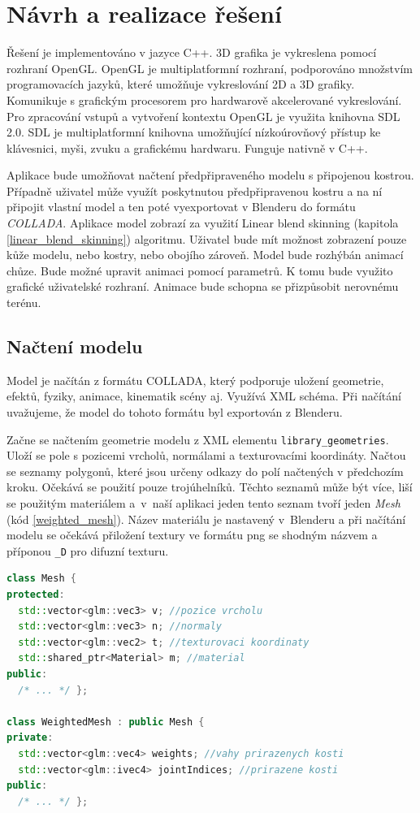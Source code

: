\chapter{Návrh a realizace řešení}
Řešení je implementováno v jazyce C++. 3D grafika je vykreslena pomocí rozhraní OpenGL. OpenGL je multiplatformní rozhraní, podporováno množstvím programovacích jazyků, které umožňuje vykreslování 2D a 3D grafiky. Komunikuje s grafickým procesorem pro hardwarově akcelerované vykreslování. Pro zpracování vstupů a vytvoření kontextu OpenGL je využita knihovna SDL 2.0. SDL je multiplatformní knihovna umožňující nízkoúrovňový přístup ke klávesnici, myši, zvuku a grafickému hardwaru. Funguje nativně v C++.

Aplikace bude umožňovat načtení předpřipraveného modelu s připojenou kostrou. Případně uživatel může využít poskytnutou předpřipravenou kostru a na ní připojit vlastní model a ten poté vyexportovat v Blenderu do formátu \textit{COLLADA}. Aplikace model zobrazí za využití Linear blend skinning (kapitola \ref{linear_blend_skinning}) algoritmu. Uživatel bude mít možnost zobrazení pouze kůže modelu, nebo kostry, nebo obojího zároveň. Model bude rozhýbán animací chůze. Bude možné upravit animaci pomocí parametrů. K tomu bude využito grafické uživatelské rozhraní. Animace bude schopna se přizpůsobit nerovnému terénu.

\section{Načtení modelu}
Model je načítán z formátu COLLADA, který podporuje uložení geometrie, efektů, fyziky, animace, kinematik scény aj. Využívá XML schéma. Při načítání uvažujeme, že model do tohoto formátu byl exportován z Blenderu.

Začne se načtením geometrie modelu z XML elementu  \texttt{library\_geometries}. Uloží se pole s pozicemi vrcholů, normálami a texturovacími koordináty. Načtou se seznamy polygonů, které jsou určeny odkazy do polí načtených v předchozím kroku. Očekává se použití pouze trojúhelníků. Těchto seznamů může být více, liší se použitým materiálem a~v~naší aplikaci jeden tento seznam tvoří jeden  \textit{Mesh} (kód \ref{weighted_mesh}). Název materiálu je nastavený v~Blenderu a při načítání modelu se očekává přiložení textury ve formátu png se shodným názvem a příponou \texttt{\_D} pro difuzní texturu.

\begin{lstlisting}[float,floatplacement=H,language=C++, caption={Třída modelu.}, label={weighted_mesh}]
class Mesh {
protected:
  std::vector<glm::vec3> v; //pozice vrcholu
  std::vector<glm::vec3> n; //normaly
  std::vector<glm::vec2> t; //texturovaci koordinaty
  std::shared_ptr<Material> m; //material
public:
  /* ... */ };
  
class WeightedMesh : public Mesh {
private:
  std::vector<glm::vec4> weights; //vahy prirazenych kosti
  std::vector<glm::ivec4> jointIndices; //prirazene kosti
public:
  /* ... */ };
\end{lstlisting}

